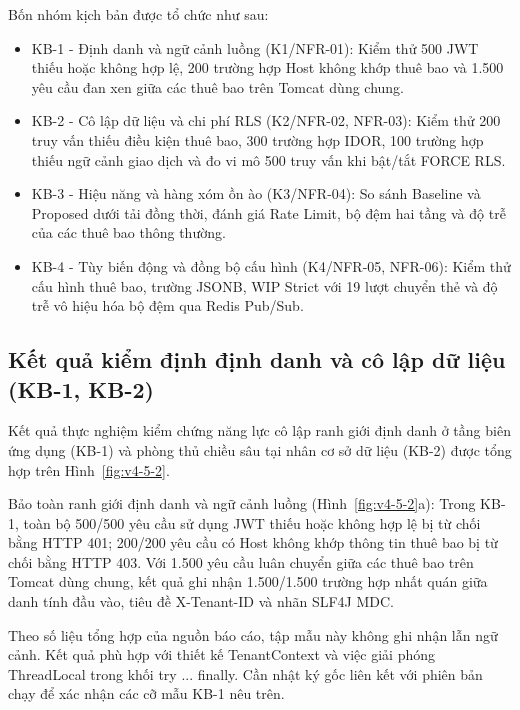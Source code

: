 Bốn nhóm kịch bản được tổ chức như sau:

\begin{itemize}
\tightlist
\item
  KB-1 - Định danh và ngữ cảnh luồng (K1/NFR-01): Kiểm thử 500 JWT thiếu hoặc không hợp lệ, 200 trường hợp Host không khớp thuê bao và 1.500 yêu cầu đan xen giữa các thuê bao trên Tomcat dùng chung.
\item
  KB-2 - Cô lập dữ liệu và chi phí RLS (K2/NFR-02, NFR-03): Kiểm thử 200 truy vấn thiếu điều kiện thuê bao, 300 trường hợp IDOR, 100 trường hợp thiếu ngữ cảnh giao dịch và đo vi mô 500 truy vấn khi bật/tắt FORCE RLS.
\item
  KB-3 - Hiệu năng và hàng xóm ồn ào (K3/NFR-04): So sánh Baseline và Proposed dưới tải đồng thời, đánh giá Rate Limit, bộ đệm hai tầng và độ trễ của các thuê bao thông thường.
\item
  KB-4 - Tùy biến động và đồng bộ cấu hình (K4/NFR-05, NFR-06): Kiểm thử cấu hình thuê bao, trường JSONB, WIP Strict với 19 lượt chuyển thẻ và độ trễ vô hiệu hóa bộ đệm qua Redis Pub/Sub.
\end{itemize}

\begin{landscape}
\renewcommand{\VfourImageMaxHeight}{.72\textheight}
\section{Kết quả kiểm định định danh và cô lập dữ liệu (KB-1, KB-2)}\label{v4-sec-5-2}

Kết quả thực nghiệm kiểm chứng năng lực cô lập ranh giới định danh ở tầng biên ứng dụng (KB-1) và phòng thủ chiều sâu tại nhân cơ sở dữ liệu (KB-2) được tổng hợp trên Hình~\ref{fig:v4-5-2}.
\end{landscape}

Bảo toàn ranh giới định danh và ngữ cảnh luồng (Hình~\ref{fig:v4-5-2}a): Trong KB-1, toàn bộ 500/500 yêu cầu sử dụng JWT thiếu hoặc không hợp lệ bị từ chối bằng HTTP 401; 200/200 yêu cầu có Host không khớp thông tin thuê bao bị từ chối bằng HTTP 403. Với 1.500 yêu cầu luân chuyển giữa các thuê bao trên Tomcat dùng chung, kết quả ghi nhận 1.500/1.500 trường hợp nhất quán giữa danh tính đầu vào, tiêu đề X-Tenant-ID và nhãn SLF4J MDC.

Theo số liệu tổng hợp của nguồn báo cáo, tập mẫu này không ghi nhận lẫn ngữ cảnh. Kết quả phù hợp với thiết kế TenantContext và việc giải phóng ThreadLocal trong khối try ... finally. Cần nhật ký gốc liên kết với phiên bản chạy để xác nhận các cỡ mẫu KB-1 nêu trên.

